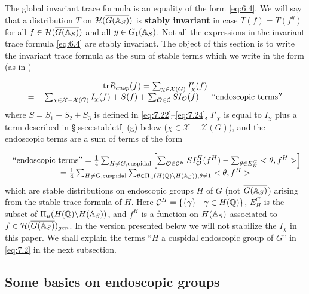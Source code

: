 The global invariant trace formula is an equality of the form \eqref{eq:6.4}.
We will say that a distribution $T$ on ${\mathcal{H}}(\overline{G(\mathbb{A} _S)})$ is 
\textbf{stably invariant} in case $T(f)=T(f^y)$ for all
$f\in {\mathcal{H}}(\overline{G(\mathbb{A} _S)})$ and all
$y\in G_1(\mathbb{A} _S)$. Not all the expressions
in the invariant trace formula \eqref{eq:6.4} are stably invariant.
The object
of this section is to write the invariant trace formula
as the sum of stable
terms which we write in the form (as in \cite{L3})

\begin{equation}\label{eq:7.1}
\begin{array}{c}
{\rm tr}R_{cusp}(f)=
\sum_{\chi \in {\mathcal{X}}(G)}I'_\chi (f)\\
=-\sum_{\chi \in {\mathcal{X}}-{\mathcal{X}}(G)}I_\chi (f)
+S(f)
+\sum_{\mathcal{O}\in \mathcal{C}}SI_{\mathcal{O}}(f)
+{\rm\ ``endoscopic\ terms''}
\end{array}
\end{equation}
where $S=S_1+S_2+S_3$ is defined in \eqref{eq:7.22}--\eqref{eq:7.24},
$I'_\chi$ is equal to $I_\chi$ plus a term described in
\S\ref{ssec:stabletf} (g) below ($\chi\in
{\mathcal{X}}-{\mathcal{X}}(G)$), and
the endoscopic terms are a sum of terms of the form

\begin{equation}\label{eq:7.2}
\begin{array}{c}
{\rm\ ``endoscopic\ terms''}
=
{1\over 4}
\sum_{ H\not= G, {\rm cuspidal}}
\left[
\sum_{{\mathcal{O}}\in {\mathcal{C}}^H}SI^H_{\mathcal{O}}(f^H)
-\sum_{\theta\in E_H^G}<\theta,f^H>
\right]\\
={1\over 4}
\sum_{ H\not= G, {\rm cuspidal}}
\sum_{
\theta\in \Pi_u(H(\mathbb{Q} )\backslash H(\mathbb{A} _S)),
\theta\not= 1}
<\theta,f^H>
\end{array}
\end{equation}
which are stable distributions on endoscopic groups $H$ of $G$
(not $\overline{G(\mathbb{A} _S)}$)
arising from the stable trace formula of $H$.
Here ${\mathcal{C}}^H=\{\{\gamma\}\ |\ \gamma\in H(\qqq )\}$,
$E_H^G$ is the subset of
$\Pi_u(H(\mathbb{Q} )\backslash {H(\mathbb{A}_S)})$,
and $f^H$ is a function on
$H(\mathbb{A} _S)$ associated to
$f\in {\mathcal{H}}(\overline{G(\mathbb{A} _S)})_{gen}$.
In the version presented below we will not
stabilize the $I_\chi$ in this paper.
We shall explain the terms ``$H$ a cuspidal endoscopic group of
$G$'' in \eqref{eq:7.2} in the next subsection.

\subsection{Some basics on endoscopic groups}

